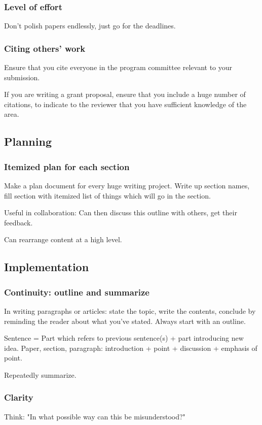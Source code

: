 \documentclass[oneside, article]{memoir}
\begin{document}
\subsubsection{Level of effort}
Don't polish papers endlessly, just go for the deadlines.


\subsubsection{Citing others' work}
Ensure that you cite everyone in the program committee relevant to your submission.

If you are writing a grant proposal, ensure that you include a huge number of citations, to indicate to the reviewer that you have sufficient knowledge of the area.


\subsection{Planning}
\subsubsection{Itemized plan for each section}
 Make a plan document for every huge writing project. Write up section names, fill section with itemized list of things which will go in the section.
 
 Useful in collaboration: Can then discuss this outline with others, get their feedback.
 
 Can rearrange content at a high level.



\subsection{Implementation}
\subsubsection{Continuity: outline and summarize}
In writing paragraphs or articles: state the topic, write the contents, conclude by reminding the reader about what you've stated. Always start with an outline.

Sentence = Part which refers to previous sentence(s) + part introducing new idea. Paper, section, paragraph: introduction + point + discussion + emphasis of point.

Repeatedly summarize.

\subsubsection{Clarity}
Think: "In what possible way can this be misunderstood?"
\end{document}
